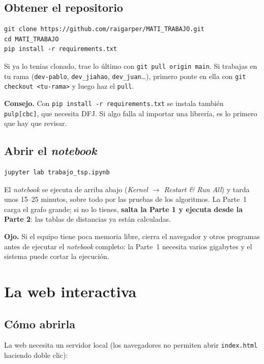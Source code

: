 \documentclass[11pt,a4paper,twoside,openany]{report}
\newcommand{\consejo}[1]{\par\vspace{0.5em}\noindent\begin{minipage}{\linewidth}\noindent\colorbox{grisclaro}{\parbox{\dimexpr\linewidth-2\fboxsep}{\small\textbf{Consejo.} #1}}\end{minipage}\par\vspace{0.5em}}
\newcommand{\aviso}[1]{\par\vspace{0.5em}\noindent\begin{minipage}{\linewidth}\noindent\colorbox{amarillo!18}{\parbox{\dimexpr\linewidth-2\fboxsep}{\small\textbf{Ojo.} #1}}\end{minipage}\par\vspace{0.5em}}
\begin{document}
\section{Obtener el repositorio}

\begin{lstlisting}
git clone https://github.com/raigarper/MATI_TRABAJO.git
cd MATI_TRABAJO
pip install -r requirements.txt
\end{lstlisting}

Si ya lo tenías clonado, trae lo último con \texttt{git pull origin main}. Si trabajas en tu rama (\texttt{dev-pablo}, \texttt{dev\_jiahao}, \texttt{dev\_juan}\dots), primero ponte en ella con \texttt{git checkout <tu-rama>} y luego haz el \texttt{pull}.

\consejo{Con \texttt{pip install -r requirements.txt} se instala también \texttt{pulp[cbc]}, que necesita DFJ. Si algo falla al importar una librería, es lo primero que hay que revisar.}

\section{Abrir el \emph{notebook}}

\begin{lstlisting}
jupyter lab trabajo_tsp.ipynb
\end{lstlisting}

El \emph{notebook} se ejecuta de arriba abajo (\emph{Kernel $\rightarrow$ Restart \& Run All}) y tarda unos 15--25 minutos, sobre todo por las pruebas de los algoritmos. La Parte~1 carga el grafo grande; si no lo tienes, \textbf{salta la Parte 1 y ejecuta desde la Parte 2}: las tablas de distancias ya están calculadas.

\aviso{Si el equipo tiene poca memoria libre, cierra el navegador y otros programas antes de ejecutar el \emph{notebook} completo: la Parte~1 necesita varios gigabytes y el sistema puede cortar la ejecución.}

\chapter{La web interactiva}\label{g:web}

\section{Cómo abrirla}

La web necesita un servidor local (los navegadores no permiten abrir \texttt{index.html} haciendo doble clic):
\end{document}
